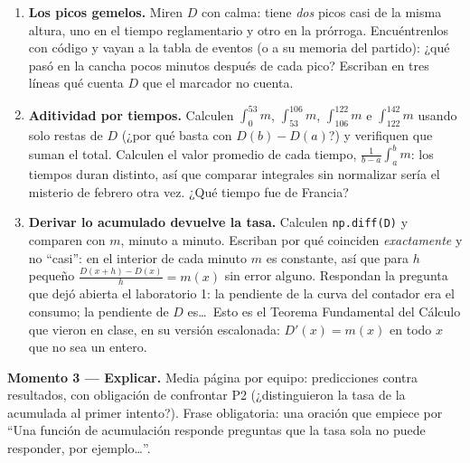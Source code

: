 \documentclass[12pt,letterpaper]{article}
\begin{document}
\begin{enumerate}[label=\arabic*.]
    \item \textbf{Los picos gemelos.} Miren $D$ con calma: tiene \emph{dos} picos casi de la misma altura, uno en el tiempo reglamentario y otro en la prórroga. Encuéntrenlos con código y vayan a la tabla de eventos (o a su memoria del partido): ¿qué pasó en la cancha pocos minutos después de cada pico? Escriban en tres líneas qué cuenta $D$ que el marcador no cuenta.
    \item \textbf{Aditividad por tiempos.} Calculen $\int_0^{53}m$, $\int_{53}^{106}m$, $\int_{106}^{122}m$ e $\int_{122}^{142}m$ usando solo restas de $D$ (¿por qué basta con $D(b)-D(a)$?) y verifiquen que suman el total. Calculen el valor promedio de cada tiempo, $\frac{1}{b-a}\int_a^b m$: los tiempos duran distinto, así que comparar integrales sin normalizar sería el misterio de febrero otra vez. ¿Qué tiempo fue de Francia?
    \item \textbf{Derivar lo acumulado devuelve la tasa.} Calculen \texttt{np.diff(D)} y comparen con $m$, minuto a minuto. Escriban por qué coinciden \emph{exactamente} y no ``casi'': en el interior de cada minuto $m$ es constante, así que para $h$ pequeño $\frac{D(x+h)-D(x)}{h}=m(x)$ sin error alguno. Respondan la pregunta que dejó abierta el laboratorio 1: la pendiente de la curva del contador era el consumo; la pendiente de $D$ es\ldots\ Esto es el Teorema Fundamental del Cálculo que vieron en clase, en su versión escalonada: $D'(x)=m(x)$ en todo $x$ que no sea un entero.
\end{enumerate}

\textbf{Momento 3 --- Explicar.} Media página por equipo: predicciones contra resultados, con obligación de confrontar P2 (¿distinguieron la tasa de la acumulada al primer intento?). Frase obligatoria: una oración que empiece por ``Una función de acumulación responde preguntas que la tasa sola no puede responder, por ejemplo\ldots''.
\end{document}
